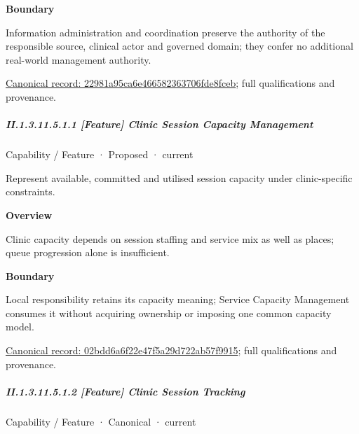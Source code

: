 \textbf{Boundary}



Information administration and coordination preserve the authority of the responsible source, clinical actor and governed domain; they confer no additional real-world management authority.


{\footnotesize \href{../../../../continuum/strategy/capability/22981a95ca6e466582363706fde8fceb.md}{Canonical record: 22981a95ca6e466582363706fde8fceb}; full qualifications and provenance.}\par
\subparagraph*{II.1.3.11.5.1.1 [Feature] Clinic Session Capacity Management}
\label{navigation:II.1.3.11.5.1.1}

\label{element:02bdd6a6f22e47f5a29d722ab57f9915}
{\small Capability / Feature · Proposed · current}\par

Represent available, committed and utilised session capacity under clinic-specific constraints.



\textbf{Overview}



Clinic capacity depends on session staffing and service mix as well as places; queue progression alone is insufficient.



\textbf{Boundary}



Local responsibility retains its capacity meaning; Service Capacity Management consumes it without acquiring ownership or imposing one common capacity model.


{\footnotesize \href{../../../../continuum/strategy/capability/feature/02bdd6a6f22e47f5a29d722ab57f9915.md}{Canonical record: 02bdd6a6f22e47f5a29d722ab57f9915}; full qualifications and provenance.}\par
\subparagraph*{II.1.3.11.5.1.2 [Feature] Clinic Session Tracking}
\label{navigation:II.1.3.11.5.1.2}

\label{element:03e185a6e0d145c3975b3f4715c94207}
{\small Capability / Feature · Canonical · current}\par

